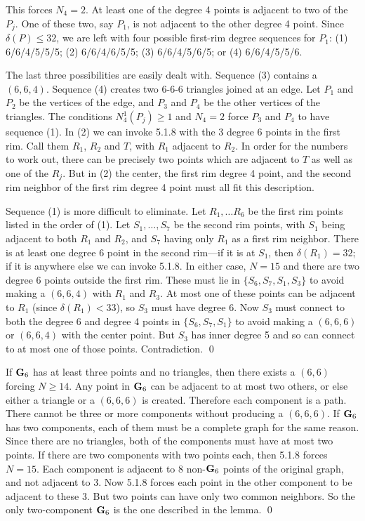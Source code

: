 This forces $N_4=2$. At least one of the degree 4 points is
adjacent to two of the $P_j$. One of these two, say $P_1$, is
not adjacent to the other degree 4 point. Since $\delta(P)\leq
32$, we are left with four possible first-rim degree sequences
for $P_1$: (1) 6/6/4/5/5/5; (2) 6/6/4/6/5/5;
(3) 6/6/4/5/6/5; or (4) 6/6/4/5/5/6.
 
The last three possibilities are easily dealt with.
Sequence (3) contains a $(6,6,4)$.  Sequence (4) creates
two 6-6-6 triangles joined at an edge. Let $P_1$ and
$P_2$ be the vertices of the edge, and $P_3$ and $P_4$
be the other vertices of the triangles.  The conditions
$N_4^1(P_j)\geq 1$ and $N_4=2$ force $P_3$ and $P_4$
to have sequence (1). In (2) we can invoke 5.1.8 with the 3
degree 6 points in the first rim. Call them $R_1$, $R_2$ and
$T$, with $R_1$ adjacent to $R_2$. In
order for the numbers to work out, there can be precisely
two points which are adjacent to $T$ as well as one of
the $R_j$. But in (2) the center,
the first rim degree 4 point, and the second rim neighbor of
the first rim degree 4 point must all fit this description.
 
Sequence (1) is more difficult to eliminate. Let $R_1,
\dots R_6$ be the first rim points listed in the order of
(1). Let $S_1, \dots, S_7$ be the second rim points, with
$S_1$ being adjacent to both $R_1$ and $R_2$, and
$S_7$ having only $R_1$ as a first rim neighbor. There is
at least one degree 6 point in the second rim---if it is at
$S_1$, then $\delta(R_1)=32$; if it is anywhere else we
can invoke 5.1.8.  In either case, $N=15$ and there are
two degree 6 points outside the first rim.  These must lie in
$\{S_6, S_7, S_1, S_3\}$ to avoid making a $(6,6,4)$
with $R_1$ and $R_3$.  At most
one of these points can be adjacent to
$R_1$ (since $\delta(R_1)<33$), so $S_3$ must
have degree 6. Now $S_3$ must connect  to both the
degree 6 and degree 4 points in $\{S_6, S_7, S_1\}$ to
avoid making a $(6,6,6)$ or $(6,6,4)$ with the center
point. But $S_3$ has inner degree 5 and so can connect to
at most one of those points. Contradiction.
\qed\enddemo
 
If $\bold G_6$ has at least three points and no triangles,
then there exists a $(6,6)$ forcing $N\geq 14$. Any point
in $\bold G_6$ can be adjacent to at most two
others, or else either a triangle or a $(6,6,6)$ is created.
Therefore each component is a path.
There cannot be three or more components without
producing a $(6,6,6)$. If $\bold G_6$ has two components,
each of them must be a complete graph for the same
reason. Since there are no triangles, both of the
components must have at most two points. If there are two
components with two points each, then 5.1.8 forces $N=15$.
Each component is adjacent to 8 non-$\bold G_6$ points of
the original graph, and not adjacent to 3. Now 5.1.8 forces
each point in the other component to be adjacent to these 3.
But two points can have only two common neighbors.
So the only two-component $\bold G_6$ is the
one described in the lemma.
\qed
\enddemo

\enddocument\bye
